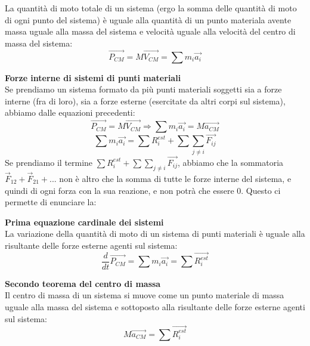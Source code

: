 \documentclass[a4paper,12pt]{article}
\begin{document}
La quantità di moto totale di un sistema (ergo la somma delle quantità di moto di ogni punto del sistema) è uguale
alla quantità di un punto materiala avente massa uguale alla massa del sistema e velocità uguale alla velocità del centro di
massa del sistema:
$$ \vec{P_{CM}} = M\vec{V_{CM}} = \sum m_i\vec{a_i} $$
\par\smallskip
\textbf{Forze interne di sistemi di punti materiali} \\
Se prendiamo un sistema formato da più punti materiali soggetti sia a forze interne (fra di loro), sia a forze esterne
(esercitate da altri corpi sul sistema), abbiamo dalle equazioni precedenti:
$$ \vec{P_{CM}} = M\vec{V_{CM}} \Rightarrow \sum m_i\vec{a_i} = M\vec{a_{CM}} $$
$$ \sum m_i\vec{a_i} = \sum R^{est}_i + \sum \sum_{j \neq i} \vec{F_{ij}} $$
Se prendiamo il termine $\sum R^{est}_i + \sum \sum_{j \neq i} \vec{F_{ij}}$, abbiamo che la sommatoria
$\vec{F}_{12} + \vec{F}_{21} + ...$ non è altro che la somma di tutte le forze interne del sistema, e quindi di ogni forza con la sua
reazione, e non potrà che essere 0. Questo ci permette di enunciare la:
\par\smallskip
\textbf{Prima equazione cardinale dei sistemi} \\
La variazione della quantità di moto di un sistema di punti materiali è uguale alla risultante delle forze esterne
agenti sul sistema:
$$ \frac{d}{dt}\vec{P_{CM}} = \sum m_i\vec{a_i} = \sum \vec{R_i^{est}} $$
\par\smallskip
\textbf{Secondo teorema del centro di massa} \\
Il centro di massa di un sistema si muove come un punto materiale di massa uguale alla massa del sistema e sottoposto alla risultante
delle forze esterne agenti sul sistema:
$$ M\vec{a_{CM}} = \sum \vec{R_i^{est}} $$
\end{document}
